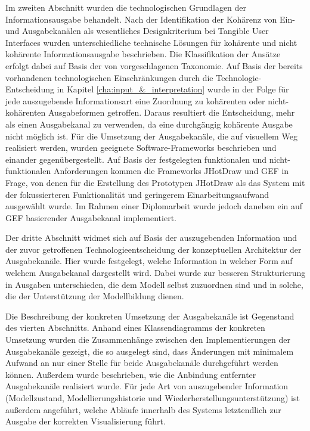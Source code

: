 Im zweiten Abschnitt wurden die technologischen Grundlagen der Informationsausgabe behandelt. Nach der Identifikation der Kohärenz von Ein- und Ausgabekanälen als wesentliches Designkriterium bei Tangible User Interfaces wurden unterschiedliche technische Lösungen für kohärente und nicht kohärente Informationsausgabe beschrieben. Die Klassifikation der Ansätze erfolgt dabei auf Basis der von \citep{Fishkin04} vorgeschlagenen Taxonomie. Auf Basis der bereits vorhandenen technologischen Einschränkungen durch die Technologie-Entscheidung in Kapitel \ref{cha:input_&_interpretation} wurde in der Folge für jede auszugebende Informationsart eine Zuordnung zu kohärenten oder nicht-kohärenten Ausgabeformen getroffen. Daraus resultiert die Entscheidung, mehr als einen Ausgabekanal zu verwenden, da eine durchgängig kohärente Ausgabe nicht möglich ist. Für die Umsetzung der Ausgabekanäle, die auf visuellem Weg realisiert werden, wurden geeignete Software-Frameworks beschrieben und einander gegenübergestellt. Auf Basis der festgelegten funktionalen und nicht-funktionalen Anforderungen kommen die Frameworks JHotDraw \citep{Gamma96} und \gls{GEF} \citep{Moore04} in Frage, von denen für die Erstellung des Prototypen JHotDraw als das System mit der fokussierteren Funktionalität und geringerem Einarbeitungsaufwand ausgewählt wurde. Im Rahmen einer Diplomarbeit \citep{Feiner08} wurde jedoch daneben ein auf \gls{GEF} basierender Ausgabekanal implementiert.

Der dritte Abschnitt widmet sich auf Basis der auszugebenden Information und der zuvor getroffenen Technologieentscheidung der konzeptuellen Architektur der Ausgabekanäle. Hier wurde festgelegt, welche Information in welcher Form auf welchem Ausgabekanal dargestellt wird. Dabei wurde zur besseren Strukturierung in Ausgaben unterschieden, die dem Modell selbst zuzuordnen sind und in solche, die der Unterstützung der Modellbildung dienen.

Die Beschreibung der konkreten Umsetzung der Ausgabekanäle ist Gegenstand des vierten Abschnitts. Anhand eines Klassendiagramms der konkreten Umsetzung wurden die Zusammenhänge zwischen den Implementierungen der Ausgabekanäle gezeigt, die so ausgelegt sind, dass Änderungen mit minimalem Aufwand an nur einer Stelle für beide Ausgabekanäle durchgeführt werden können. Außerdem wurde beschrieben, wie die Anbindung entfernter Ausgabekanäle realisiert wurde. Für jede Art von auszugebender Information (Modellzustand, Modellierungshistorie und Wiederherstellungsunterstützung) ist außerdem angeführt, welche Abläufe innerhalb des Systems letztendlich zur Ausgabe der korrekten Visualisierung führt. 

